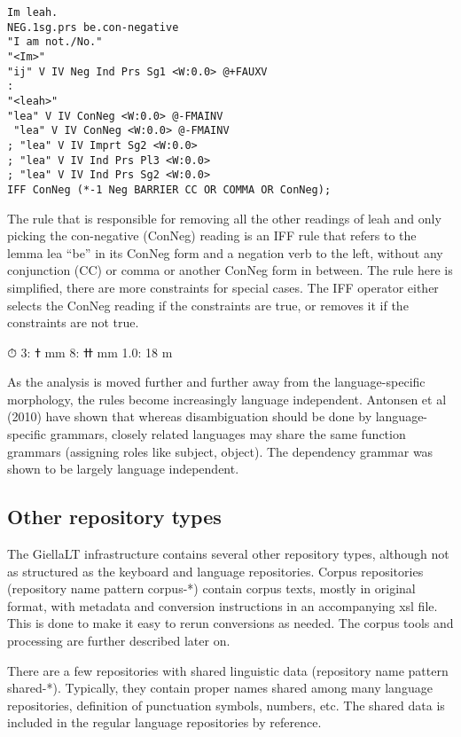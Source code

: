 \documentclass[free]{flammie}
\begin{document}
\begin{verbatim}
Im leah.
NEG.1sg.prs be.con-negative
"I am not./No."
"<Im>"
"ij" V IV Neg Ind Prs Sg1 <W:0.0> @+FAUXV
:
"<leah>"
"lea" V IV ConNeg <W:0.0> @-FMAINV
 "lea" V IV ConNeg <W:0.0> @-FMAINV
; "lea" V IV Imprt Sg2 <W:0.0>
; "lea" V IV Ind Prs Pl3 <W:0.0>
; "lea" V IV Ind Prs Sg2 <W:0.0>
IFF ConNeg (*-1 Neg BARRIER CC OR COMMA OR ConNeg);
\end{verbatim}

The rule that is responsible for removing all the other readings of leah and only picking the
con-negative (ConNeg) reading is an IFF rule that refers to the lemma lea “be” in its ConNeg form and a negation verb to the left, without any conjunction (CC) or comma or
another ConNeg form in between. The rule here is simplified, there are more constraints
for special cases. The IFF operator either selects the ConNeg reading if the constraints are
true, or removes it if the constraints are not true.

⏱
ߙ :3 mm
ߚ :8 mm
1.0: 18 m

As the analysis is moved further and further away from the language-specific morphology, the rules become increasingly language independent. Antonsen et al (2010) have
shown that whereas disambiguation should be done by language-specific grammars,
closely related languages may share the same function grammars (assigning roles like subject, object). The dependency grammar was shown to be largely language independent.

\subsection{Other repository types}

The GiellaLT infrastructure contains several other repository types, although not as structured as the keyboard and language repositories. Corpus repositories (repository name pattern corpus-*) contain corpus texts, mostly in original format, with metadata and conversion instructions in an accompanying xsl file. This is done to make it easy to rerun
conversions as needed. The corpus tools and processing are further described later on.

There are a few repositories with shared linguistic data (repository name pattern
shared-*). Typically, they contain proper names shared among many language repositories, definition of punctuation symbols, numbers, etc. The shared data is included in the
regular language repositories by reference.
\end{document}
